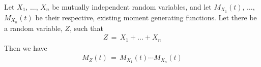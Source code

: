 \begin{theorem}
    Let $X_{1}$, $\dots$, $X_{n}$ be mutually independent random variables, and let $M_{X_{1}}(t)$, $\dots$, $M_{X_{n}}(t)$ be their respective, existing moment generating functions. Let there be a random variable, $Z$, such that
    \begin{align*}
        Z \hspace{2pt} = \hspace{2pt} X_{1} + \dots + X_{n}
    \end{align*}
    Then we have
    \begin{align*}
        M_{Z}(t) \hspace{2pt} = \hspace{2pt} M_{X_{1}}(t) \cdots M_{X_{n}}(t)
    \end{align*}
\end{theorem}